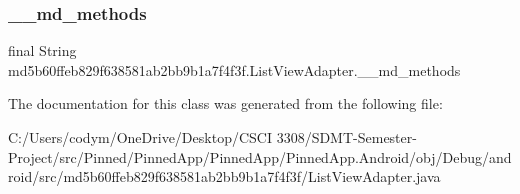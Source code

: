 \subsubsection{\texorpdfstring{\+\_\+\+\_\+md\+\_\+methods}{\_\_md\_methods}}
{\footnotesize\ttfamily final String md5b60ffeb829f638581ab2bb9b1a7f4f3f.\+List\+View\+Adapter.\+\_\+\+\_\+md\+\_\+methods\hspace{0.3cm}{\ttfamily [static]}}



The documentation for this class was generated from the following file\+:\begin{DoxyCompactItemize}
\item 
C\+:/\+Users/codym/\+One\+Drive/\+Desktop/\+C\+S\+C\+I 3308/\+S\+D\+M\+T-\/\+Semester-\/\+Project/src/\+Pinned/\+Pinned\+App/\+Pinned\+App/\+Pinned\+App.\+Android/obj/\+Debug/android/src/md5b60ffeb829f638581ab2bb9b1a7f4f3f/List\+View\+Adapter.\+java\end{DoxyCompactItemize}
